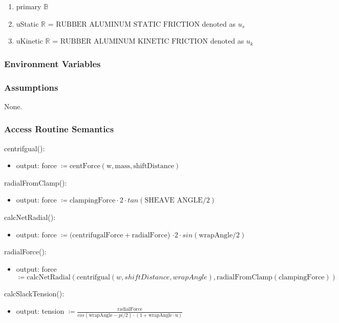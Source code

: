 \documentclass[12pt, titlepage]{article}
\begin{document}
\begin{enumerate}
  \item primary $\mathbb{B}$
  \item uStatic $\mathbb{R}$ = $\text{RUBBER ALUMINUM STATIC FRICTION}$ denoted as $u_s$
  \item uKinetic $\mathbb{R}$ = $\text{RUBBER ALUMINUM KINETIC FRICTION}$ denoted as $u_k$
\end{enumerate}

\subsubsection{Environment Variables}

\subsubsection{Assumptions}

None.

\subsubsection{Access Routine Semantics}

\noindent centrifgual():
\begin{itemize}
  \item output: force $\coloneq \text{centForce}(\text{w}, \text{mass}, \text{shiftDistance})$
\end{itemize}

\noindent radialFromClamp():
\begin{itemize}
  \item output: force $\coloneq \text{clampingForce} \cdot 2 \cdot tan(\text{SHEAVE ANGLE}/2)$
\end{itemize}

\noindent calcNetRadial():
\begin{itemize}
  \item output: force $\coloneq (\text{centrifugalForce} + \text{radialForce}$) $\cdot 2 \cdot sin(\text{wrapAngle}/2)$
\end{itemize}

\noindent radialForce():
\begin{itemize}
  \item output: force $\coloneq \text{calcNetRadial}(\text{centrifgual}(w, shiftDistance, wrapAngle), \text{radialFromClamp}(\text{clampingForce}))$
\end{itemize}

\noindent calcSlackTension():
\begin{itemize}
  \item output: tension $\coloneq \frac{\text{radialForce}}{cos(\text{wrapAngle}-pi /2) \cdot (1 + \text{wrapAngle} \cdot \text{u})}$
\end{itemize}
\end{document}
